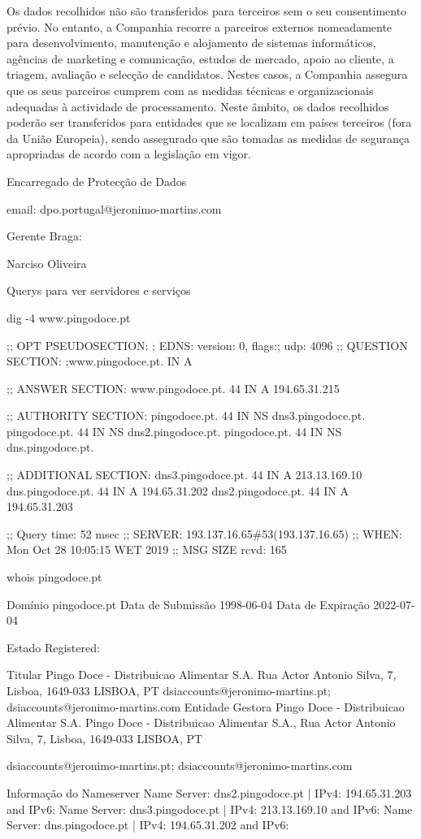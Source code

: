 Os dados recolhidos não são transferidos para terceiros sem o seu consentimento prévio. No entanto, a Companhia recorre a parceiros externos nomeadamente para desenvolvimento, manutenção e alojamento de sistemas informáticos, agências de marketing e comunicação, estudos de mercado, apoio ao cliente, a triagem, avaliação e selecção de candidatos. Nestes casos, a Companhia assegura que os seus parceiros cumprem com as medidas técnicas e organizacionais adequadas à actividade de processamento. Neste âmbito, os dados recolhidos poderão ser transferidos para entidades que se localizam em países terceiros (fora da União Europeia), sendo assegurado que são tomadas as medidas de segurança apropriadas de acordo com a legislação em vigor.


Encarregado de Protecção de Dados

email: dpo.portugal@jeronimo-martins.com


Gerente Braga:

Narciso Oliveira


Querys para ver servidores e serviços

dig -4 www.pingodoce.pt


;; OPT PSEUDOSECTION:
; EDNS: version: 0, flags:; udp: 4096
;; QUESTION SECTION:
;www.pingodoce.pt.		IN	A

;; ANSWER SECTION:
www.pingodoce.pt.	44	IN	A	194.65.31.215

;; AUTHORITY SECTION:
pingodoce.pt.		44	IN	NS	dns3.pingodoce.pt.
pingodoce.pt.		44	IN	NS	dns2.pingodoce.pt.
pingodoce.pt.		44	IN	NS	dns.pingodoce.pt.

;; ADDITIONAL SECTION:
dns3.pingodoce.pt.	44	IN	A	213.13.169.10
dns.pingodoce.pt.	44	IN	A	194.65.31.202
dns2.pingodoce.pt.	44	IN	A	194.65.31.203

;; Query time: 52 msec
;; SERVER: 193.137.16.65\#53(193.137.16.65)
;; WHEN: Mon Oct 28 10:05:15 WET 2019
;; MSG SIZE  rcvd: 165


whois pingodoce.pt


Domínio	pingodoce.pt
Data de Submissão	1998-06-04
Data de Expiração	2022-07-04

Estado	Registered:

Titular	Pingo Doce - Distribuicao Alimentar S.A.
Rua Actor Antonio Silva, 7, Lisboa, 1649-033 LISBOA, PT
dsiaccounts@jeronimo-martins.pt; dsiaccounts@jeronimo-martins.com
Entidade Gestora	Pingo Doce - Distribuicao Alimentar S.A.
Pingo Doce - Distribuicao Alimentar S.A., Rua Actor Antonio Silva, 7, Lisboa, 1649-033 LISBOA, PT

dsiaccounts@jeronimo-martins.pt;
dsiaccounts@jeronimo-martins.com

Informação do Nameserver	
Name Server: dns2.pingodoce.pt | IPv4: 194.65.31.203 and IPv6:
Name Server: dns3.pingodoce.pt | IPv4: 213.13.169.10 and IPv6:
Name Server: dns.pingodoce.pt  | IPv4: 194.65.31.202 and IPv6: